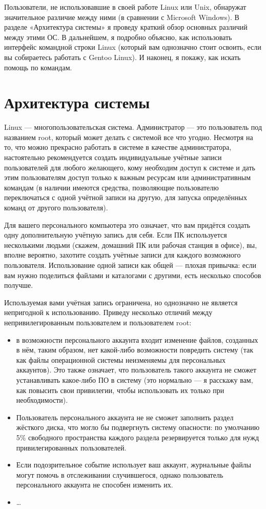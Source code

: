 \documentclass[12pt]{book}
\begin{document}
Пользователи, не использовавшие в своей работе Linux или Unix, обнаружат значительное различие между ними (в сравнении с Microsoft Windows). В разделе «Архитектура системы» я проведу краткий обзор основных различий между этими ОС. В дальнейшем, я подробно объясню, как использовать интерфейс командной строки Linux (который вам однозначно стоит освоить, если вы собираетесь работать с Gentoo Linux). И наконец, я покажу, как искать помощь по командам.

\section{Архитектура системы}

Linux --- многопользовательская система. Администратор --- это пользователь под названием root, который может делать с системой все что угодно. Несмотря на то, что можно прекрасно работать в системе в качестве администратора, настоятельно рекомендуется создать индивидуальные учётные записи пользователей для любого желающего, кому необходим доступ к системе и дать этим пользователям доступ только к важным ресурсам или административным командам (в наличии имеются средства, позволяющие пользователю переключаться с одной учётной записи на другую, для запуска определённых команд от другого пользователя). 

Для вашего персонального компьютера это означает, что вам придётся создать одну дополнительную учётную запись для себя. Если ПК используется несколькими людьми (скажем, домашний ПК или рабочая станция в офисе), вы, вполне вероятно, захотите создать учётные записи для каждого возможного пользователя. Использование одной записи как общей — плохая привычка: если вам нужно поделиться файлами и каталогами с другими, есть несколько способов получше.

Используемая вами учётная запись ограничена, но однозначно не является непригодной к использованию. Приведу несколько отличий между непривилегированным пользователем и пользователем root:

\begin{itemize}
	\item в возможности персонального аккаунта входит изменение файлов, созданных в нём, таким образом, нет какой-либо возможности повредить систему (так как файлы операционной системы неизменяемы для персональных аккаунтов). Это также означает, что пользователь такого аккаунта не сможет устанавливать какое-либо ПО в систему (это нормально — я расскажу вам, как повысить свои привилегии, чтобы использовать их только при необходимости).
	\item Пользователь персонального аккаунта не не сможет заполнить раздел жёсткого диска, что могло бы подвергнуть систему опасности: по умолчанию 5\% свободного пространства каждого раздела резервируется только для нужд привилегированных пользователей.
	\item Если подозрительное событие использует ваш аккаунт, журнальные файлы могут помочь в отслеживании случившегося, однако пользователь  персонального аккаунта не способен изменить их.
	\item \ldots
\end{itemize}
\end{document}
